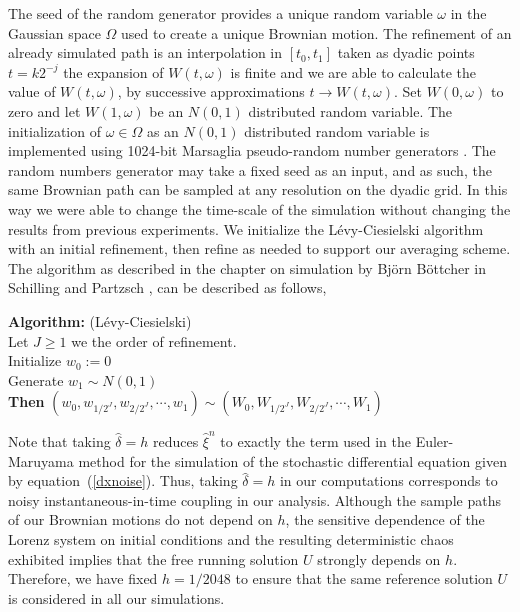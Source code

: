 \documentclass[master,tocprelim,12pt]{unrthesis}
\theoremstyle{definition}
\numberwithin{equation}{chapter}
\begin{document}
\begin{manuscript}
The seed of the random generator provides a unique random
variable $\omega$ in the Gaussian space $\Omega$ used to create a unique Brownian motion.
The refinement of an already simulated path
is an interpolation in $[t_0, t_1]$
taken as dyadic points $t= k2^{-j}$ the expansion of $W(t, \omega)$ is finite and
we are able to calculate the value of
$W(t, \omega)$, by successive approximations $t \to W(t, \omega)$.
Set $W(0,\omega)$ to zero and let $W(1,\omega)$ be an $N(0,1)$ 
distributed random variable.
The initialization of $\omega \in \Omega$ as an $N(0,1)$ distributed random
variable is implemented using 1024-bit Marsaglia pseudo-random 
number generators \cite{Marsaglia2003}.
The random numbers generator may take a fixed seed as an input, and as such,
the same Brownian 
path can be sampled at any resolution on the dyadic grid. In this way we were able
to change the time-scale of the simulation without changing the results from
previous experiments.
We initialize the L\'evy-Ciesielski algorithm with an initial refinement, then refine
as needed to support our averaging scheme. The algorithm as described in
the chapter on simulation by Bj\"orn B\"ottcher in
Schilling and Partzsch \cite{Schilling2012},
can be described as follows,

\begin{algorithm}[ht]
 \textbf{Algorithm:} (L\'evy-Ciesielski)\\
Let $J\ge1$ we the order of refinement.\\
Initialize $w_0 := 0$\\
Generate $w_1 \sim N(0,1)$\\
\textbf{Then} $(w_0, w_{1/2^J}, w_{2/2^J},\cdots , w_1) \sim (W_0, W_{1/2^J}, W_{2/2^J},\cdots , W_1)$
\end{algorithm}

Note that taking $\hat\delta=h$ reduces $\hat\xi^n$
to exactly the term used in the Euler-Maruyama method
for the simulation of the stochastic differential
equation given by equation~(\ref{dxnoise}).  
Thus, taking $\hat\delta=h$ in our computations corresponds 
to noisy in\-stan\-tan\-eous-in-time coupling in our analysis.
Although the sample paths of our Brownian motions 
do not depend on $h$, 
the sensitive dependence of the 
Lorenz system on initial conditions and the 
resulting deterministic chaos exhibited implies that the 
free running solution $U$ strongly depends on $h$.
Therefore, we have fixed $h=1/2048$ to ensure that the same 
reference solution $U$ is considered in all our simulations.


\end{manuscript}
\end{document}
